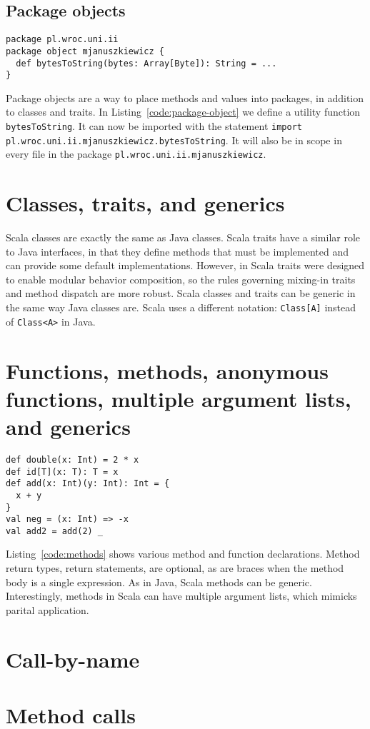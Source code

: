 \subsection{Package objects}

\begin{lstlisting}[caption=Package object, label=code:package-object, escapechar=|, float, floatplacement=H]
package pl.wroc.uni.ii
package object mjanuszkiewicz {
  def bytesToString(bytes: Array[Byte]): String = ...
}
\end{lstlisting}

Package objects are a way to place methods and values into packages, in addition to classes and traits.
In Listing~\ref{code:package-object} we define a utility function \texttt{bytesToString}.
It can now be imported with the statement \texttt{import pl.wroc.uni.ii.mjanuszkiewicz.bytesToString}.
It will also be in scope in every file in the package \texttt{pl.wroc.uni.ii.mjanuszkiewicz}.

\section{Classes, traits, and generics}

Scala classes are exactly the same as Java classes.
Scala traits have a similar role to Java interfaces, in that they define methods that must be implemented and can provide some default implementations.
However, in Scala traits were designed to enable modular behavior composition, so the rules governing mixing-in traits and method dispatch are more robust.
Scala classes and traits can be generic in the same way Java classes are.
Scala uses a different notation: \texttt{Class[A]} instead of \texttt{Class<A>} in Java.

\section{Functions, methods, anonymous functions, multiple argument lists, and generics}

\begin{lstlisting}[caption=Methods and functions, label=code:methods, escapechar=|, float, floatplacement=H]
def double(x: Int) = 2 * x
def id[T](x: T): T = x
def add(x: Int)(y: Int): Int = {
  x + y
}
val neg = (x: Int) => -x
val add2 = add(2) _

\end{lstlisting}

Listing~\ref{code:methods} shows various method and function declarations.
Method return types, return statements, are optional, as are braces when the method body is a single expression.
As in Java, Scala methods can be generic.
Interestingly, methods in Scala can have multiple argument lists, which mimicks parital application.


\section{Call-by-name}

\section{Method calls}
